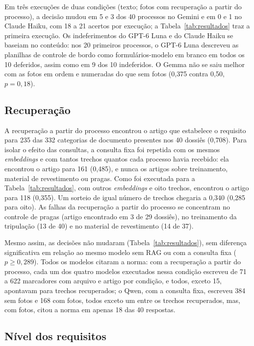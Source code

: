 Em três execuções de duas condições (texto; fotos com recuperação a partir do processo), a decisão mudou em 5 e 3 dos 40 processos no Gemini e em 0 e 1 no Claude Haiku, com 18 a 21 acertos por execução; a Tabela~\ref{tab:resultados} traz a primeira execução. Os indeferimentos do GPT-6 Luna e do Claude Haiku se baseiam no conteúdo: nos 20 primeiros processos, o GPT-6 Luna descreveu as planilhas de controle de bordo como formulários-modelo em branco em todos os 10 deferidos, assim como em 9 dos 10 indeferidos. O Gemma não se saiu melhor com as fotos em ordem e numeradas do que sem fotos (0,375 contra 0,50, $p=0{,}18$).

\subsection{Recuperação}

A recuperação a partir do processo encontrou o artigo que estabelece o requisito para 235 das 332 categorias de documento presentes nos 40 dossiês (0,708). Para isolar o efeito das consultas, a consulta fixa foi repetida com os mesmos \textit{embeddings} e com tantos trechos quantos cada processo havia recebido: ela encontrou o artigo para 161 (0,485), e nunca os artigos sobre treinamento, material de revestimento ou pragas. Como foi executada para a Tabela~\ref{tab:resultados}, com outros \textit{embeddings} e oito trechos, encontrou o artigo para 118 (0,355). Um sorteio de igual número de trechos chegaria a 0,340 (0,285 para oito). As falhas da recuperação a partir do processo se concentram no controle de pragas (artigo encontrado em 3 de 29 dossiês), no treinamento da tripulação (13 de 40) e no material de revestimento (14 de 37).

Mesmo assim, as decisões não mudaram (Tabela~\ref{tab:resultados}), sem diferença significativa em relação ao mesmo modelo sem RAG ou com a consulta fixa ($p\ge0{,}289$). Todos os modelos citaram a norma: com a recuperação a partir do processo, cada um dos quatro modelos executados nessa condição escreveu de 71 a 622 marcadores com arquivo e artigo por condição, e todos, exceto 15, apontavam para trechos recuperados; o Qwen, com a consulta fixa, escreveu 384 sem fotos e 168 com fotos, todos exceto um entre os trechos recuperados, mas, com fotos, citou a norma em apenas 18 das 40 respostas.

\subsection{Nível dos requisitos}

